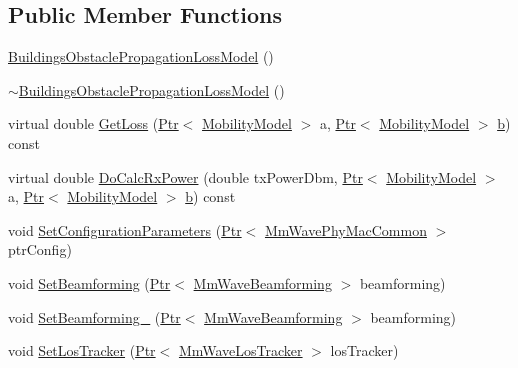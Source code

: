 \subsection*{Public Member Functions}
\begin{DoxyCompactItemize}
\item 
\hyperlink{classns3_1_1BuildingsObstaclePropagationLossModel_ac6aa04f41b411d22f813623bb854be1f}{Buildings\+Obstacle\+Propagation\+Loss\+Model} ()
\item 
\hyperlink{classns3_1_1BuildingsObstaclePropagationLossModel_a3928e347dced7cc33291f099c1ae892e}{$\sim$\+Buildings\+Obstacle\+Propagation\+Loss\+Model} ()
\item 
virtual double \hyperlink{classns3_1_1BuildingsObstaclePropagationLossModel_aeb4896558411b94c66c1070dd800b1e1}{Get\+Loss} (\hyperlink{classns3_1_1Ptr}{Ptr}$<$ \hyperlink{classns3_1_1MobilityModel}{Mobility\+Model} $>$ a, \hyperlink{classns3_1_1Ptr}{Ptr}$<$ \hyperlink{classns3_1_1MobilityModel}{Mobility\+Model} $>$ \hyperlink{lte__pathloss_8m_a21ad0bd836b90d08f4cf640b4c298e7c}{b}) const 
\item 
virtual double \hyperlink{classns3_1_1BuildingsObstaclePropagationLossModel_ae938f5d032fe35e93ffc3c98450947d3}{Do\+Calc\+Rx\+Power} (double tx\+Power\+Dbm, \hyperlink{classns3_1_1Ptr}{Ptr}$<$ \hyperlink{classns3_1_1MobilityModel}{Mobility\+Model} $>$ a, \hyperlink{classns3_1_1Ptr}{Ptr}$<$ \hyperlink{classns3_1_1MobilityModel}{Mobility\+Model} $>$ \hyperlink{lte__pathloss_8m_a21ad0bd836b90d08f4cf640b4c298e7c}{b}) const 
\item 
void \hyperlink{classns3_1_1BuildingsObstaclePropagationLossModel_a7ea21722ed4f1156815721cf5db9bc7f}{Set\+Configuration\+Parameters} (\hyperlink{classns3_1_1Ptr}{Ptr}$<$ \hyperlink{classns3_1_1MmWavePhyMacCommon}{Mm\+Wave\+Phy\+Mac\+Common} $>$ ptr\+Config)
\item 
void \hyperlink{classns3_1_1BuildingsObstaclePropagationLossModel_a913ca68cff3b65f5ec0482143b8fab2c}{Set\+Beamforming} (\hyperlink{classns3_1_1Ptr}{Ptr}$<$ \hyperlink{classns3_1_1MmWaveBeamforming}{Mm\+Wave\+Beamforming} $>$ beamforming)
\item 
void \hyperlink{classns3_1_1BuildingsObstaclePropagationLossModel_a031fa053b1da00e9bed04bdcfb28bca2}{Set\+Beamforming\+\_} (\hyperlink{classns3_1_1Ptr}{Ptr}$<$ \hyperlink{classns3_1_1MmWaveBeamforming}{Mm\+Wave\+Beamforming} $>$ beamforming)
\item 
void \hyperlink{classns3_1_1BuildingsObstaclePropagationLossModel_af0e1bfde4944ddb27dea21078c682123}{Set\+Los\+Tracker} (\hyperlink{classns3_1_1Ptr}{Ptr}$<$ \hyperlink{classns3_1_1MmWaveLosTracker}{Mm\+Wave\+Los\+Tracker} $>$ los\+Tracker)
\end{DoxyCompactItemize}

